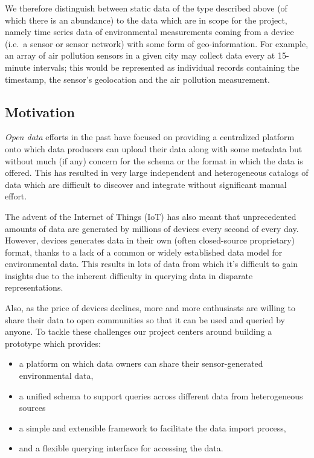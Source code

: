 We therefore distinguish between static data of the type described above
(of which there is an abundance) to the data which are in scope for the
project, namely time series data of environmental measurements coming
from a device (i.e.~a sensor or sensor network) with some form of
geo-information. For example, an array of air pollution sensors in a
given city may collect data every at 15-minute intervals; this would be
represented as individual records containing the timestamp, the sensor's
geolocation and the air pollution measurement.

\subsection{Motivation}\label{motivation}

\emph{Open data} efforts in the past have focused on providing a
centralized platform onto which data producers can upload their data
along with some metadata but without much (if any) concern for the
schema or the format in which the data is offered. This has resulted in
very large independent and heterogeneous catalogs of data which are
difficult to discover and integrate without significant manual effort.

The advent of the Internet of Things (IoT) has also meant that
unprecedented amounts of data are generated by millions of devices every
second of every day. However, devices generates data in their own (often
closed-source proprietary) format, thanks to a lack of a common or
widely established data model for environmental data. This results in
lots of data from which it's difficult to gain insights due to the
inherent difficulty in querying data in disparate representations.

Also, as the price of devices declines, more and more enthusiasts are
willing to share their data to open communities so that it can be used
and queried by anyone. To tackle these challenges our project centers
around building a prototype which provides:

\begin{itemize}
\tightlist
\item
  a platform on which data owners can share their sensor-generated
  environmental data,
\item
  a unified schema to support queries across different data from
  heterogeneous sources
\item
  a simple and extensible framework to facilitate the data import
  process,
\item
  and a flexible querying interface for accessing the data.
\end{itemize}

